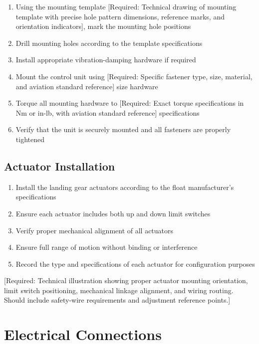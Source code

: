 \documentclass[12pt,a4paper,twoside,openright]{book}
\begin{document}
\begin{enumerate}
    \item Using the mounting template {\color{missingred}[Required: Technical drawing of mounting template with precise hole pattern dimensions, reference marks, and orientation indicators]}, mark the mounting hole positions
    \item Drill mounting holes according to the template specifications
    \item Install appropriate vibration-damping hardware if required
    \item Mount the control unit using {\color{missingred}[Required: Specific fastener type, size, material, and aviation standard reference]} size hardware
    \item Torque all mounting hardware to {\color{missingred}[Required: Exact torque specifications in Nm or in-lb, with aviation standard reference]} specifications
    \item Verify that the unit is securely mounted and all fasteners are properly tightened
\end{enumerate}

\subsection{Actuator Installation}

\begin{enumerate}
    \item Install the landing gear actuators according to the float manufacturer's specifications
    \item Ensure each actuator includes both up and down limit switches
    \item Verify proper mechanical alignment of all actuators
    \item Ensure full range of motion without binding or interference
    \item Record the type and specifications of each actuator for configuration purposes
\end{enumerate}

{\color{missingred}[Required: Technical illustration showing proper actuator mounting orientation, limit switch positioning, mechanical linkage alignment, and wiring routing. Should include safety-wire requirements and adjustment reference points.]}

\section{Electrical Connections}
\end{document}
